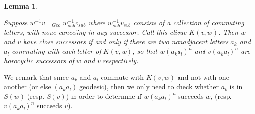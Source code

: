 \documentclass{amsart}
\newtheorem{lemma}[theorem]{Lemma}
\theoremstyle{definition}
\theoremstyle{remark}
\begin{document}
	\begin{lemma}\label{CliqueDifferenceAdjacency}
		
		Suppose $w^{-1}v=_{Geo}w_{sub}^{-1}v_{sub}$ where $w_{sub}^{-1}v_{sub}$ consists of a collection of commuting letters, with none canceling in any successor. Call this clique $K(v,w)$. Then $w$ and $v$ have close successors if and only if there are two nonadjacent letters $a_k$ and $a_l$ commuting with each letter of $K(v,w)$, so that $w(a_ka_l)^n$ and $v(a_ka_l)^n$ are horocyclic successors of $w$ and $v$ respectively.
		
	\end{lemma}
	
	We remark that since $a_k$ and $a_l$ commute with $K(v,w)$ and not with one another (or else $(a_ka_l)$ geodesic), then we only need to check whether $a_k$ is in $S(w)$  (resp. $S(v)$) in order to determine if $w(a_ka_l)^n$ succeeds $w$, (resp. $v(a_ka_l)^n$ succeeds $v$).
	
\end{document}
